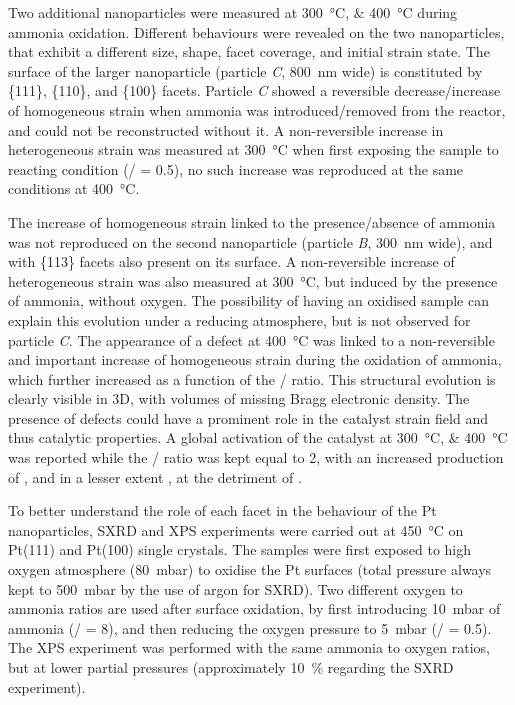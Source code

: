 Two additional nanoparticles were measured at \qtylist{300;400}{\degreeCelsius} during ammonia oxidation.
Different behaviours were revealed on the two nanoparticles, that exhibit a different size, shape, facet coverage, and initial strain state.
The surface of the larger nanoparticle (particle \textit{C}, \qty{800}{\nm} wide) is constituted by  \{111\}, \{110\}, and \{100\} facets.
Particle \textit{C} showed a reversible decrease/increase of homogeneous strain when ammonia was introduced/removed from the reactor, and could not be reconstructed without it.
A non-reversible increase in heterogeneous strain was measured at \qty{300}{\degreeCelsius} when first exposing the sample to reacting condition (/ = 0.5), no such increase was reproduced at the same conditions at \qty{400}{\degreeCelsius}.

The increase of homogeneous strain linked to the presence/absence of ammonia was not reproduced on the second nanoparticle (particle \textit{B}, \qty{300}{\nm} wide), and with \{113\} facets also present on its surface.
A non-reversible increase of heterogeneous strain was also measured at \qty{300}{\degreeCelsius}, but induced by the presence of ammonia, without oxygen.
The possibility of having an oxidised sample can explain this evolution under a reducing atmosphere, but is not observed for particle \textit{C}.
The appearance of a defect at \qty{400}{\degreeCelsius} was linked to a non-reversible and important increase of homogeneous strain during the oxidation of ammonia, which further increased as a function of the / ratio.
This structural evolution is clearly visible in 3D, with volumes of missing Bragg electronic density.
The presence of defects could have a prominent role in the catalyst strain field and thus catalytic properties.
A global activation of the catalyst at \qtylist{300;400}{\degreeCelsius} was reported while the / ratio was kept equal to 2, with an increased production of , and in a lesser extent , at the detriment of .

To better understand the role of each facet in the behaviour of the Pt nanoparticles, SXRD and XPS experiments were carried out at \qty{450}{\degreeCelsius} on Pt(111) and Pt(100) single crystals.
The samples were first exposed to high oxygen atmosphere (\qty{80}{\milli\bar}) to oxidise the Pt surfaces (total pressure always kept to \qty{500}{\milli\bar} by the use of argon for SXRD).
Two different oxygen to ammonia ratios are used after surface oxidation, by first introducing \qty{10}{\milli\bar} of ammonia (/ = \num{8}), and then reducing the oxygen pressure to \qty{5}{\milli\bar} (/ = \num{0.5}).
The XPS experiment was performed with the same ammonia to oxygen ratios, but at lower partial pressures (approximately \qty{10}{\percent} regarding the SXRD experiment).

